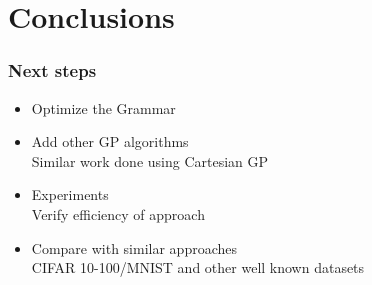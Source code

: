 \documentclass[aspectratio=169]{beamer}
\begin{document}
	\section{Conclusions}
		\begin{frame}
			\frametitle{Next steps}
			
			\begin{itemize}
				\item Optimize the Grammar

				\item Add other GP algorithms\\
					\textcolor{ExecusharesGrey}{\small\hspace{1em}Similar work done using Cartesian GP}

				\item Experiments\\
					\textcolor{ExecusharesGrey}{\small\hspace{1em}Verify efficiency of approach}

				\item Compare with similar approaches\\
					\textcolor{ExecusharesGrey}{\small\hspace{1em}CIFAR 10-100/MNIST and other well known datasets}

			\end{itemize}
		\end{frame}
		\frame{\acknowledgmentpage}
\end{document}
